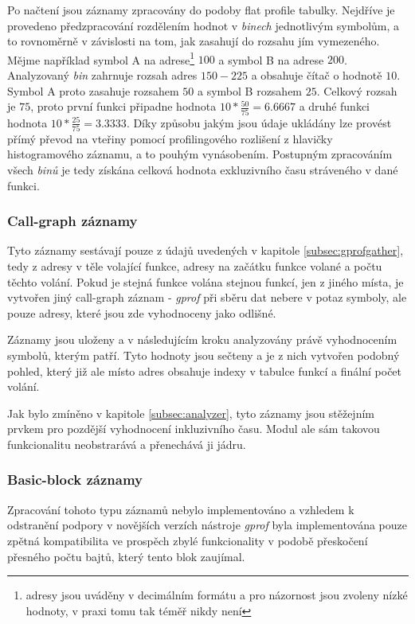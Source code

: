 \documentclass[czech,BP]{thesiskiv}
\begin{document}
Po načtení jsou záznamy zpracovány do podoby flat profile tabulky. Nejdříve je provedeno předzpracování rozdělením hodnot v \emph{binech} jednotlivým symbolům, a to rovnoměrně v závislosti na tom, jak zasahují do rozsahu jím vymezeného. Mějme například symbol A na adrese\footnote{adresy jsou uváděny v decimálním formátu a pro názornost jsou zvoleny nízké hodnoty, v praxi tomu tak téměř nikdy není} $100$ a symbol B na adrese $200$. Analyzovaný \emph{bin} zahrnuje rozsah adres $150 - 225$ a obsahuje čítač o hodnotě $10$. Symbol A proto zasahuje rozsahem $50$ a symbol B rozsahem $25$. Celkový rozsah je $75$, proto první funkci připadne hodnota $10*\frac{50}{75}=6.6667$ a druhé funkci hodnota $10*\frac{25}{75}=3.3333$. Díky způsobu jakým jsou údaje ukládány lze provést přímý převod na vteřiny pomocí profilingového rozlišení z hlavičky histogramového záznamu, a to pouhým vynásobením. Postupným zpracováním všech \emph{binů} je tedy získána celková hodnota exkluzivního času stráveného v dané funkci.

\subsubsection*{Call-graph záznamy}

Tyto záznamy sestávají pouze z údajů uvedených v kapitole \ref{subsec:gprofgather}, tedy z adresy v těle volající funkce, adresy na začátku funkce volané a počtu těchto volání. Pokud je stejná funkce volána stejnou funkcí, jen z jiného místa, je vytvořen jiný call-graph záznam - \emph{gprof} při sběru dat nebere v potaz symboly, ale pouze adresy, které jsou zde vyhodnoceny jako odlišné.

Záznamy jsou uloženy a v následujícím kroku analyzovány právě vyhodnocením symbolů, kterým patří. Tyto hodnoty jsou sečteny a je z nich vytvořen podobný pohled, který již ale místo adres obsahuje indexy v tabulce funkcí a finální počet volání.

Jak bylo zmíněno v kapitole \ref{subsec:analyzer}, tyto záznamy jsou stěžejním prvkem pro pozdější vyhodnocení inkluzivního času. Modul ale sám takovou funkcionalitu neobstrarává a přenechává ji jádru.

\subsubsection*{Basic-block záznamy}

Zpracování tohoto typu záznamů nebylo implementováno a vzhledem k odstranění podpory v novějších verzích nástroje \emph{gprof} byla implementována pouze zpětná kompatibilita ve prospěch zbylé funkcionality v podobě přeskočení přesného počtu bajtů, který tento blok zaujímal.
\end{document}
